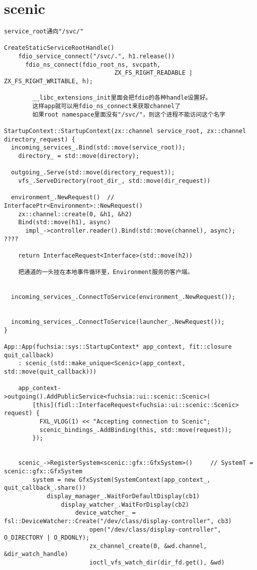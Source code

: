 \section{scenic}

\begin{verbatim}
service_root通向"/svc/"

CreateStaticServiceRootHandle()
    fdio_service_connect("/svc/.", h1.release())
      fdio_ns_connect(fdio_root_ns, svcpath,
                               ZX_FS_RIGHT_READABLE | ZX_FS_RIGHT_WRITABLE, h);

        __libc_extensions_init里面会把fdio的各种handle设置好。
        这样app就可以用fdio_ns_connect来获取channel了
        如果root namespace里面没有"/svc/"，则这个进程不能访问这个名字

StartupContext::StartupContext(zx::channel service_root, zx::channel directory_request) {
  incoming_services_.Bind(std::move(service_root));
    directory_ = std::move(directory);
  
  outgoing_.Serve(std::move(directory_request));
    vfs_.ServeDirectory(root_dir_, std::move(dir_request))
  
  environment_.NewRequest()  // InterfacePtr<Environment>::NewRequest()
    zx::channel::create(0, &h1, &h2)
    Bind(std::move(h1), async)
      impl_->controller.reader().Bind(std::move(channel), async);  ????
    
    return InterfaceRequest<Interface>(std::move(h2))

    把通道的一头挂在本地事件循环里，Environment服务的客户端。


  incoming_services_.ConnectToService(environment_.NewRequest());


  incoming_services_.ConnectToService(launcher_.NewRequest());
}

App::App(fuchsia::sys::StartupContext* app_context, fit::closure quit_callback)
    : scenic_(std::make_unique<Scenic>(app_context, std::move(quit_callback)))

    app_context->outgoing().AddPublicService<fuchsia::ui::scenic::Scenic>(
        [this](fidl::InterfaceRequest<fuchsia::ui::scenic::Scenic> request) {
          FXL_VLOG(1) << "Accepting connection to Scenic";
          scenic_bindings_.AddBinding(this, std::move(request));
        });


    scenic_->RegisterSystem<scenic::gfx::GfxSystem>()     // SystemT = scenic::gfx::GfxSystem
        system = new GfxSystem(SystemContext(app_context_, quit_callback_.share())
            display_manager_.WaitForDefaultDisplay(cb1)
                display_watcher_.WaitForDisplay(cb2)
                    device_watcher_ = fsl::DeviceWatcher::Create("/dev/class/display-controller", cb3)
                        open("/dev/class/display-controller", O_DIRECTORY | O_RDONLY);
                        zx_channel_create(0, &wd.channel, &dir_watch_handle)
                        ioctl_vfs_watch_dir(dir_fd.get(), &wd)


\end{verbatim}
